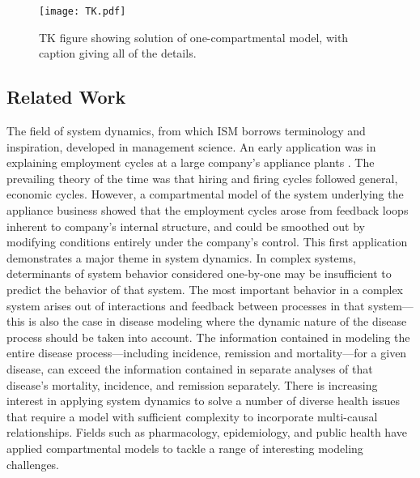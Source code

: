\begin{figure}[h]
\begin{center}
\texttt{[image: TK.pdf]}
\caption{TK figure showing solution of one-compartmental model, with
  caption giving all of the details.}
\label{forward-sim-one-compartment-soln}
\end{center}
\end{figure}


\subsection{Related Work}

The field of system dynamics, from which ISM borrows terminology and
inspiration, developed in management science. An early application was
in explaining employment cycles at a large company's appliance plants
\cite{Forrester_Counterintuitive_1971}. The prevailing theory of the
time was that hiring and firing cycles followed general, economic
cycles. However, a compartmental model of the system underlying the
appliance business showed that the employment cycles arose from
feedback loops inherent to company's internal structure, and could be
smoothed out by modifying conditions entirely under the company's
control. This first application demonstrates a major theme in system
dynamics. In complex systems, determinants of system behavior
considered one-by-one may be insufficient to predict the behavior of
that system. The most important behavior in a complex system arises
out of interactions and feedback between processes in that
system---this is also the case in disease modeling where the dynamic
nature of the disease process should be taken into account. The
information contained in modeling the entire disease
process---including incidence, remission and mortality---for a given
disease, can exceed the information contained in separate analyses of
that disease's mortality, incidence, and remission separately. There
is increasing interest in applying system dynamics to solve a number
of diverse health issues that require a model with sufficient
complexity to incorporate multi-causal relationships. Fields such as
pharmacology, epidemiology, and public health have applied
compartmental models to tackle a range of interesting modeling
challenges.

